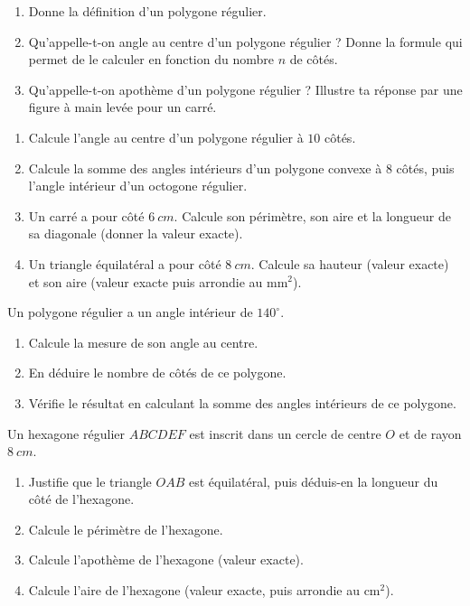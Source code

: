 \documentclass[11pt]{article}
\newcommand{\cle}[1]{{\popxbold\color{popdark}#1}}
\newcounter{popsec}
\newcounter{popsub}
\newcommand{\courssub}[1]{%
  \stepcounter{popsub}%
  \par\vspace{9pt}\noindent{\popxbold\fontsize{11.5}{13}\selectfont\color{popink}{\color{poporange}\thepopsec.\thepopsub}\hspace{6pt}#1}\par\nopagebreak\vspace{4pt}
}
\begin{document}
\begin{exercice}[Définitions]
\begin{enumerate}
\item Donne la définition d'un polygone régulier.
\item Qu'appelle-t-on \cle{angle au centre} d'un polygone régulier ? Donne la formule qui permet de le calculer en fonction du nombre $n$ de côtés.
\item Qu'appelle-t-on \cle{apothème} d'un polygone régulier ? Illustre ta réponse par une figure à main levée pour un carré.
\end{enumerate}
\end{exercice}

\begin{exercice}
\begin{enumerate}
\item Calcule l'angle au centre d'un polygone régulier à $10$ côtés.
\item Calcule la somme des angles intérieurs d'un polygone convexe à $8$ côtés, puis l'angle intérieur d'un octogone régulier.
\item Un carré a pour côté $\SI{6}{cm}$. Calcule son périmètre, son aire et la longueur de sa diagonale (donner la valeur exacte).
\item Un triangle équilatéral a pour côté $\SI{8}{cm}$. Calcule sa hauteur (valeur exacte) et son aire (valeur exacte puis arrondie au $\text{mm}^2$).
\end{enumerate}
\end{exercice}

\courssub{Je m'entraîne}

\begin{exercice}
Un polygone régulier a un angle intérieur de $140^{\circ}$.
\begin{enumerate}
\item Calcule la mesure de son angle au centre.
\item En déduire le nombre de côtés de ce polygone.
\item Vérifie le résultat en calculant la somme des angles intérieurs de ce polygone.
\end{enumerate}
\end{exercice}

\begin{exercice}
Un hexagone régulier $ABCDEF$ est inscrit dans un cercle de centre $O$ et de rayon $\SI{8}{cm}$.
\begin{enumerate}
\item Justifie que le triangle $OAB$ est équilatéral, puis déduis-en la longueur du côté de l'hexagone.
\item Calcule le périmètre de l'hexagone.
\item Calcule l'apothème de l'hexagone (valeur exacte).
\item Calcule l'aire de l'hexagone (valeur exacte, puis arrondie au $\text{cm}^2$).
\end{enumerate}
\end{exercice}
\end{document}
